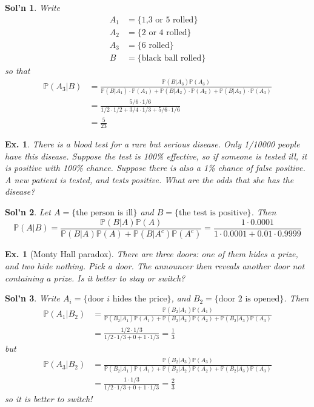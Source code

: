 \documentclass[12pt, a4paper]{book}
\renewcommand{\Pr}{\mathbb{P}}
\newtheorem{example}[theorem]{Ex.}
\theoremstyle{nonumberplain}
\newtheorem{solution}{Sol'n}
\begin{document}
\begin{solution}
    Write
    \begin{align*}
        A_1 &= \{\text{1,3 or 5 rolled}\}\\
        A_2 &= \{\text{2 or 4 rolled}\}\\
        A_3 &= \{\text{6 rolled}\}\\
        B &= \{\text{black ball rolled}\}
    \end{align*}
    so that
    \begin{align*}
        \Pr(A_3|B) &= \frac{\Pr(B|A_3)\Pr(A_3)}{\Pr(B|A_1)\cdot \Pr(A_1)+\Pr(B|A_2)\cdot\Pr(A_2)+\Pr(B|A_3)\cdot\Pr(A_3)}\\
                   &= \frac{5/6\cdot 1/6}{1/2\cdot 1/2+3/4\cdot1/3+5/6\cdot 1/6}\\
                   &=\frac{5}{23}
    \end{align*}
\end{solution}
\begin{example}
    There is a blood test for a rare but serious disease.
    Only 1/10000 people have this disease.
    Suppose the test is 100\% effective, so if someone is tested ill, it is positive with 100\% chance.
    Suppose there is also a 1\% chance of false positive.
    A new patient is tested, and tests positive.
    What are the odds that she has the disease?
\end{example}
\begin{solution}
    Let $A=\{\text{the person is ill}\}$ and $B=\{\text{the test is positive}\}$.
    Then
    \[\Pr(A|B)=\frac{\Pr(B|A)\Pr(A)}{\Pr(B|A)\Pr(A)+\Pr(B|A^c)\Pr(A^c)}=\frac{1\cdot 0.0001}{1\cdot 0.0001+0.01\cdot0.9999}\]
\end{solution}
\begin{example}[Monty Hall paradox]
    There are three doors: one of them hides a prize, and two hide nothing.
    Pick a door.
    The announcer then reveals another door not containing a prize.
    Is it better to stay or switch?
\end{example}
\begin{solution}
    Write $A_i=\{\text{door $i$ hides the price}\}$, and $B_2=\{\text{door $2$ is opened}\}$.
    Then
    \begin{align*}
        \Pr(A_1|B_2)&=\frac{\Pr(B_2|A_1)\Pr(A_1)}{\Pr(B_2|A_1)\Pr(A_1)+\Pr(B_2|A_2)\Pr(A_2)+\Pr(B_2|A_3)\Pr(A_3)}\\
                                         &=\frac{1/2\cdot1/3}{1/2\cdot1/3+0+1\cdot1/3}=\frac{1}{3}
    \end{align*}
    but
    \begin{align*}
        \Pr(A_3|B_2)&=\frac{\Pr(B_2|A_3)\Pr(A_3)}{\Pr(B_2|A_1)\Pr(A_1)+\Pr(B_2|A_2)\Pr(A_2)+\Pr(B_2|A_3)\Pr(A_3)}\\
                                         &=\frac{1\cdot1/3}{1/2\cdot1/3+0+1\cdot1/3}=\frac{2}{3}
    \end{align*}
    so it is better to switch!
\end{solution}
\end{document}
